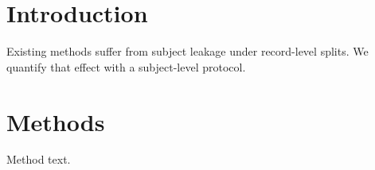 \documentclass{article}
\begin{document}
\section{Introduction}
Existing methods suffer from subject leakage under record-level splits.
We quantify that effect with a subject-level protocol.
\section{Methods}
Method text.
\end{document}
